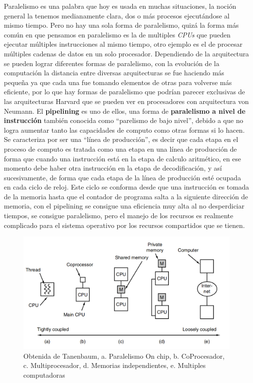 \documentclass[letterpaper,12pt,oneside]{book}
\begin{document}
		Paralelismo es una palabra que hoy es usada en muchas situaciones, la noción general la tenemos medianamente clara, dos o más procesos
		ejecutándose al mismo tiempo. Pero no hay una sola forma de paralelismo, quizá la forma más común en que pensamos en paralelismo
		es la de multiples \textit{CPUs} que pueden ejecutar múltiples instrucciones al mismo tiempo, otro ejemplo es el de procesar
		múltiples cadenas de datos en un solo procesador. Dependiendo de la arquitectura se pueden lograr diferentes formas de paralelismo,
		con la evolución de la computación la distancia entre diversas arquitecturas se fue haciendo más pequeña ya que cada una fue tomando
		elementos de otras para volverse más eficiente, por lo que hay formas de paralelismo que podrían parecer exclusivas de las arquitecturas
		Harvard  que se pueden ver en procesadores con arquitectura von Neumann. El \textbf{pipelining} es uno de ellos, una forma de \textbf{paralelismo
		a nivel de instrucción} también conocida como ``parelismo de bajo nivel'', debido a que no logra aumentar tanto las capacidades
		de computo como otras formas si lo hacen. Se caracteriza por ser una ``línea de producción'', es decir que cada etapa en el proceso de computo es 
		tratada
		como una etapa en una línea de producción de forma que cuando una instrucción está en la etapa de calculo aritmético, en ese momento
		debe haber otra instrucción en la etapa de decodificación, y así sucesivamente, de forma que cada etapa de la línea de producción
		esté ocupada en cada ciclo de reloj. Este ciclo se conforma desde que una instrucción es tomada de la memoria hasta que el contador
		de programa salta a la siguiente dirección de memoria, con el pipelining se consigue una eficiencia muy alta al no desperdiciar tiempos,
		se consigue paralelismo, pero el manejo de los recursos es realmente complicado para el sistema operativo por los recursos compartidos que
		se tienen\cite[p.421]{null_essentials_2003}.
		
		\begin{figure}[h]
 			\centering
			\includegraphics[scale=0.3]{media/ParalelismoTanenbaun.png}
			\caption{Obtenida de Tanenbaum, a. Paralelismo On chip, b. CoProcesador, c. Multiprocesador, d. Memorias independientes, e. Multiples computadoras}%
			\label{fig:Paralelismo}
		\end{figure}
		
\end{document}
